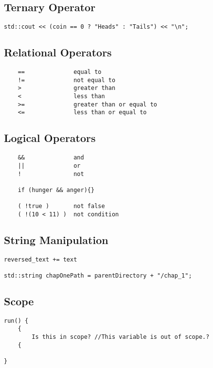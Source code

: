 \documentclass[openany]{report}
\begin{document}
\subsection{Ternary Operator}
\begin{verbatim}
std::cout << (coin == 0 ? "Heads" : "Tails") << "\n";
\end{verbatim}

\subsection{Relational Operators}

\begin{verbatim}
    ==              equal to
    !=              not equal to
    >               greater than
    <               less than
    >=              greater than or equal to
    <=              less than or equal to
\end{verbatim}

\subsection{Logical Operators}

\begin{verbatim}
    &&              and 
    ||              or
    !               not

    if (hunger && anger){}

    ( !true )       not false
    ( !(10 < 11) )  not condition 
\end{verbatim}

\subsection{String Manipulation}

\begin{verbatim}
reversed_text += text

std::string chapOnePath = parentDirectory + "/chap_1";
\end{verbatim}

\subsection{Scope}

\begin{verbatim}
run() {
    {
        Is this in scope? //This variable is out of scope.?
    {
    
}
\end{verbatim}
\end{document}
